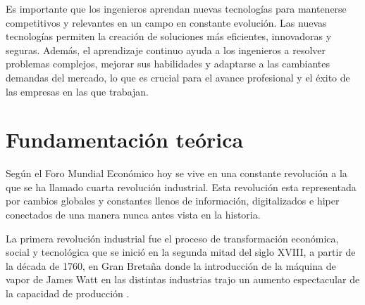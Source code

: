     Es importante que los ingenieros aprendan nuevas tecnologías para mantenerse competitivos y relevantes en un campo en constante evolución. Las nuevas tecnologías permiten la creación de soluciones más eficientes, innovadoras y seguras. Además, el aprendizaje continuo ayuda a los ingenieros a resolver problemas complejos, mejorar sus habilidades y adaptarse a las cambiantes demandas del mercado, lo que es crucial para el avance profesional y el éxito de las empresas en las que trabajan.
    
    \section{Fundamentación teórica}
    
    Según el Foro Mundial Económico hoy se vive en una constante revolución a la que se ha llamado cuarta revolución industrial. Esta revolución esta representada por cambios globales y constantes llenos de información, digitalizados e hiper conectados de una manera nunca antes vista en la historia.
    
    La primera revolución industrial fue el proceso de transformación económica, social y tecnológica que se inició en la segunda mitad del siglo XVIII, a partir de la década de 1760, en Gran Bretaña donde la introducción de la máquina de vapor de James Watt en las distintas industrias trajo un aumento espectacular de la capacidad de producción .
    
